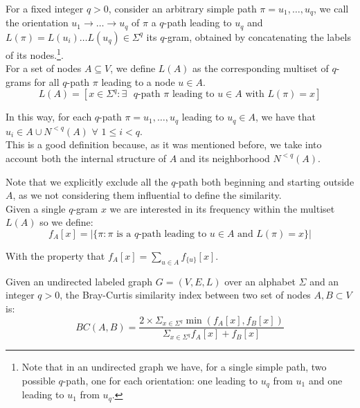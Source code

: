 For a fixed integer $q > 0$, consider an arbitrary simple path $\pi = u_{1}, \ldots, u_{q}$, we call the orientation $u_{1} \rightarrow \ldots \rightarrow u_{q}$ of $\pi$ a $q$-path leading to $u_{q}$ and $L(\pi) = L(u_{i}) \ldots L(u_{q}) \in \Sigma^{q}$ its $q$-gram, obtained by concatenating the labels of its nodes.\footnote{Note that in an undirected graph we have, for a single simple path, two possible $q$-path, one for each orientation: one leading to $u_{q}$ from $u_{1}$ and one leading to $u_{1}$ from $u_{q}$.}.\\

For a set of nodes $A \subseteq V$, we define $L(A)$ as the corresponding multiset of $q$-grams for all $q$-path $\pi$ leading to a node $u \in A$. 
\begin{equation}
L(A) = [x \in \Sigma^{q} : \exists \text{ $q$-path } \pi \text{ leading to } u \in A \text{ with } L(\pi) = x]
\end{equation}

In this way, for each $q$-path $\pi = u_{1}, \ldots, u_{q}$ leading to $u_{q} \in A$, we have that $u_{i} \in A \cup N^{<q}(A)$ $\forall$ $1 \leq i < q$. \\

This is a good definition because, as it was mentioned before, we take into account both the internal structure of $A$ and its neighborhood $N^{<q}(A)$. 

Note that we explicitly exclude all the $q$-path both beginning and starting outside $A$, as we not considering them influential to define the similarity.\\

Given a single $q$-gram $x$ we are interested in its frequency within the multiset $L(A)$ so we define:
\begin{equation}
	f_{A}[x] = |\{ \pi : \pi \text{ is a $q$-path leading to } u \in A \text{ and } L(\pi) = x \}|
\end{equation}

With the property that $f_{A}[x] = \sum_{u \in A}{f_{\{u\}}[x]}$.

\begin{definizione}
	Given an undirected labeled graph $G = (V,E,L)$ over an alphabet $\Sigma$ and an integer $q > 0$, the Bray-Curtis similarity index between two set of nodes $A, B \subset V$ is:
	\begin{equation}\label{bray-sub}
		BC(A,B) = \frac{ 2 \times \Sigma_{x \in \Sigma^{q}} \min(f_{A}[x], f_{B}[x]) }{ \Sigma_{x \in \Sigma^{q}} f_{A}[x] + f_{B}[x] }
	\end{equation}
\end{definizione}

